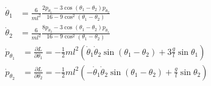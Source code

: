 \documentclass[portrait,a0b,final,a4resizeable]{a0poster}
\def\jointspacing{\vspace{0.3in}}
\begin{document}
\begin{poster}
\begin{multicols}{2}
      \centering
      ${\displaystyle {\begin{aligned}{{\dot {\theta }}_{1}}&={\frac {6}{ml^{2}}}{\frac {2p_{\theta _{1}}-3\cos(\theta _{1}-\theta _{2})p_{\theta _{2}}}{16-9\cos ^{2}(\theta _{1}-\theta _{2})}}\\{{\dot {\theta }}_{2}}&={\frac {6}{ml^{2}}}{\frac {8p_{\theta _{2}}-3\cos(\theta _{1}-\theta _{2})p_{\theta _{1}}}{16-9\cos ^{2}(\theta _{1}-\theta _{2})}}\end{aligned}}}$\\
      ${\displaystyle {\begin{aligned}{{\dot {p}}_{\theta _{1}}}&={\frac {\partial L}{\partial \theta _{1}}}=-{\tfrac {1}{2}}ml^{2}\left({{\dot {\theta }}_{1}}{{\dot {\theta }}_{2}}\sin(\theta _{1}-\theta _{2})+3{\frac {g}{l}}\sin \theta _{1}\right)\\{{\dot {p}}_{\theta _{2}}}&={\frac {\partial L}{\partial \theta _{2}}}=-{\tfrac {1}{2}}ml^{2}\left(-{{\dot {\theta }}_{1}}{{\dot {\theta }}_{2}}\sin(\theta _{1}-\theta _{2})+{\frac {g}{l}}\sin \theta _{2}\right)\end{aligned}}}$\\
      \null\hspace*{2cm}\begin{minipage}[c]{0.80\columnwidth}\center{}
      \end{minipage}

      \jointspacing



\end{multicols}
\end{poster}
\end{document}

